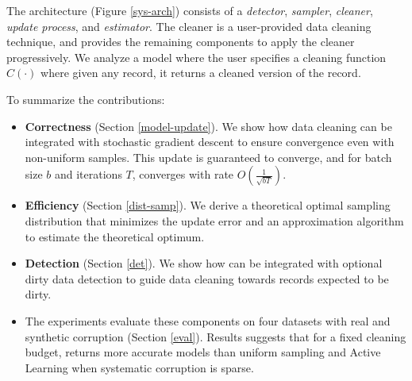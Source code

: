 
The \sys architecture (Figure \ref{sys-arch}) consists of a \emph{detector}, \emph{sampler}, \emph{cleaner}, \emph{update process}, and \emph{estimator}.
The cleaner is a user-provided data cleaning technique, and \sys provides the remaining components to apply the cleaner progressively.
We analyze a model where the user specifies a cleaning function $C(\cdot)$ where given any record, it returns a cleaned version of the record.

\noindent To summarize the contributions:
\begin{itemize}[noitemsep]
\item \textbf{Correctness} (Section \ref{model-update}). We show how data cleaning can be integrated with stochastic gradient descent to ensure convergence even with non-uniform samples. This update is guaranteed to converge, and for batch size $b$ and iterations $T$, converges with rate $O(\frac{1}{\sqrt{bT}})$. 
\item \textbf{Efficiency} (Section \ref{dist-samp}). We derive a theoretical optimal sampling distribution that minimizes the update error and an approximation algorithm to estimate the theoretical optimum.
\item \textbf{Detection} (Section \ref{det}). We show how \sys can be integrated with optional dirty data detection to guide data cleaning towards records expected to be dirty.
\item The experiments evaluate these components on four datasets with real and synthetic corruption (Section \ref{eval}). Results suggests that for a fixed cleaning budget, \sys returns more accurate models than uniform sampling and Active Learning when systematic corruption is sparse.

\end{itemize}







